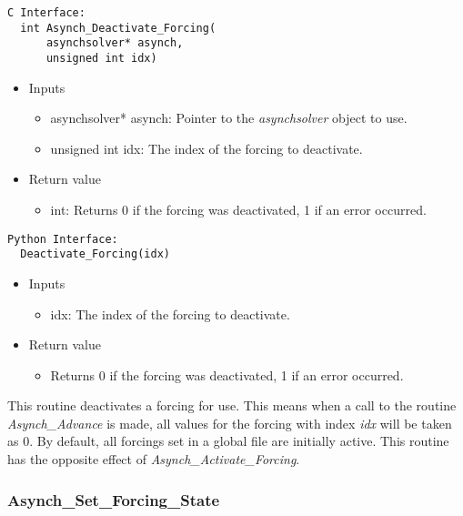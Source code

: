 \documentclass[12pt]{article}
\begin{document}
\begin{lstlisting}[style=CStyle]
  C Interface:
  int Asynch_Deactivate_Forcing(
      asynchsolver* asynch,
      unsigned int idx)
\end{lstlisting}
\begin{itemize}
 \item Inputs
  \begin{itemize}
   \item asynchsolver* asynch: Pointer to the \emph{asynchsolver} object to use.
   \item unsigned int idx: The index of the forcing to deactivate.
  \end{itemize}
 \item Return value
  \begin{itemize}
   \item int: Returns 0 if the forcing was deactivated, 1 if an error occurred.
  \end{itemize}
\end{itemize}
\begin{lstlisting}[style=PythonStyle]
  Python Interface:
  Deactivate_Forcing(idx)
\end{lstlisting}
\begin{itemize}
 \item Inputs
  \begin{itemize}
   \item idx: The index of the forcing to deactivate.
  \end{itemize}
 \item Return value
  \begin{itemize}
   \item Returns 0 if the forcing was deactivated, 1 if an error occurred.
  \end{itemize}
\end{itemize}
This routine deactivates a forcing for use. This means when a call to the routine \emph{Asynch\_Advance} is made, all values for the forcing with index \emph{idx} will be taken as 0. By default, all forcings set in a global file are initially active. This routine has the opposite effect of \emph{Asynch\_Activate\_Forcing}.



\subsubsection{Asynch\_Set\_Forcing\_State} \label{sec: asynch_set_forcing_state}
\end{document}
